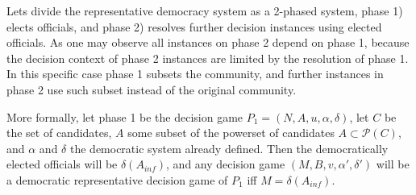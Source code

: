 Lets divide the representative democracy system as a 2-phased system, phase 1) elects officials, and phase 2) resolves further decision instances using elected officials. As one may observe all instances on phase 2 depend on phase 1, because the decision context of phase 2 instances are limited by the resolution of phase 1. In this specific case phase 1 subsets the community, and further instances in phase 2 use such subset instead of the original community. 

More formally, let phase 1 be the decision game $ P_1 = (N, A, u, \alpha, \delta)$, let $C$ be the set of candidates, $A$ some subset of the powerset of candidates $A \subset \mathscr{P}(C)$, and $\alpha$ and $\delta$ the democratic system already defined. Then the democratically elected officials will be $\delta(A_{inf})$, and any decision game $(M, B, v, \alpha', \delta')$ will be a democratic representative decision game of $P_1$ iff $M = \delta(A_{inf})$. 
